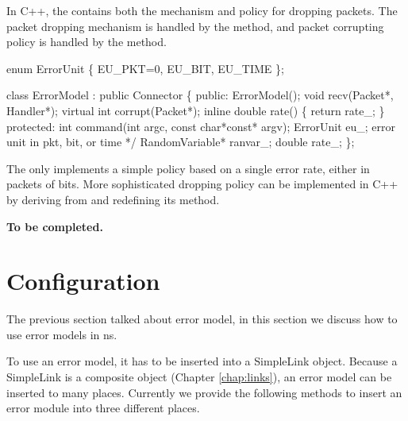 In C++, the  contains both the mechanism and policy for
dropping packets.  The packet dropping mechanism is handled by the
 method, and packet corrupting policy is handled by the
 method.
\begin{program}
        enum ErrorUnit \{ EU_PKT=0, EU_BIT, EU_TIME \};

        class ErrorModel : public Connector \{
        public:
                ErrorModel();
                void recv(Packet*, Handler*);
                virtual int corrupt(Packet*);
                inline double rate() \{ return rate_; \}
        protected:
                int command(int argc, const char*const* argv);
                ErrorUnit eu_;          \* error unit in pkt, bit, or time */
                RandomVariable* ranvar_;
                double rate_;
        \};
\end{program}
The  only implements a simple policy based on a single
error rate, either in packets of bits.  More sophisticated dropping
policy can be implemented in C++ by deriving from  and
redefining its  method.

{\bf To be completed.}

\section{Configuration}

The previous section talked about error model, in this section we
discuss how to use error models in ns. 

To use an error model, it has to be inserted into a SimpleLink
object. Because a SimpleLink is a composite object (Chapter
\ref{chap:links}), an error model can
be inserted to many places. Currently we provide the following methods
to insert an error module into three different places. 

